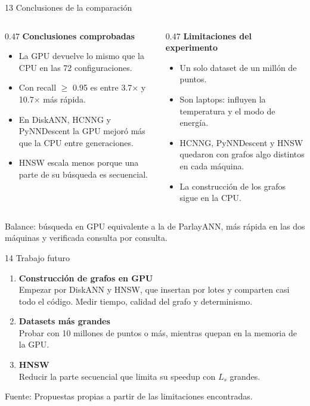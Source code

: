 \documentclass[aspectratio=169,10pt]{beamer}
\newcommand{\x}{$\times$}
\newcommand{\fuente}[1]{\vfill{\scriptsize\color{gray}Fuente: #1}}
\newcommand{\nota}[1]{\begin{center}\colorbox{azul!10}{\parbox{0.94\textwidth}{\centering\small #1}}\end{center}}
\begin{document}
\begin{frame}{13 \quad Conclusiones de la comparación}
  \begin{columns}[T]
    \begin{column}{0.47\textwidth}
      \textbf{Conclusiones comprobadas}
      \begin{itemize}
        \item La GPU devuelve lo mismo que la CPU en las 72 configuraciones.
        \item Con recall $\geq$ 0.95 es entre 3.7\x{} y 10.7\x{} más rápida.
        \item En DiskANN, HCNNG y PyNNDescent la GPU mejoró más que la CPU entre
              generaciones.
        \item HNSW escala menos porque una parte de su búsqueda es secuencial.
      \end{itemize}
    \end{column}
    \begin{column}{0.47\textwidth}
      \textbf{Limitaciones del experimento}
      \begin{itemize}
        \item Un solo dataset de un millón de puntos.
        \item Son laptops: influyen la temperatura y el modo de energía.
        \item HCNNG, PyNNDescent y HNSW quedaron con grafos algo distintos en cada máquina.
        \item La construcción de los grafos sigue en la CPU.
      \end{itemize}
    \end{column}
  \end{columns}
  \vspace{6pt}
  \nota{Balance: búsqueda en GPU equivalente a la de ParlayANN, más rápida en las dos
  máquinas y verificada consulta por consulta.}
\end{frame}

\begin{frame}{14 \quad Trabajo futuro}
  \begin{enumerate}
    \item \textbf{Construcción de grafos en GPU}\\
          Empezar por DiskANN y HNSW, que insertan por lotes y comparten casi todo el código.
          Medir tiempo, calidad del grafo y determinismo.
    \item \textbf{Datasets más grandes}\\
          Probar con 10 millones de puntos o más, mientras quepan en la memoria de la GPU.
    \item \textbf{HNSW}\\
          Reducir la parte secuencial que limita su speedup con $L_s$ grandes.
  \end{enumerate}
  \fuente{Propuestas propias a partir de las limitaciones encontradas.}
\end{frame}
\end{document}

